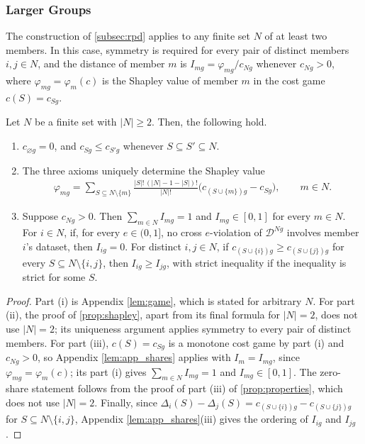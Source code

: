\documentclass[11 pt]{article}
\begin{document}
\subsubsection{Larger Groups}\label{subsec:app_largerN}

The construction of \autoref{subsec:rpd} applies to any finite set $N$ of at least two members. In this case, symmetry is required for every pair of distinct members $i, j \in N$, and the distance of member $m$ is $I_{mg} = \varphi_{mg}/c_{Ng}$ whenever $c_{Ng} > 0$, where $\varphi_{mg} = \varphi_{m}(c)$ is the Shapley value of member $m$ in the cost game $c(S) = c_{Sg}$.

\begin{proposition}\label{prop:app_largerN}
Let $N$ be a finite set with $|N| \geq 2$. Then, the following hold.
\begin{enumerate}
\item[(i)] $c_{\varnothing g} = 0$, and $c_{Sg} \leq c_{S'g}$ whenever $S \subseteq S' \subseteq N$.
\item[(ii)] The three axioms uniquely determine the Shapley value
\begin{align*}
\varphi_{mg} = \sum_{S \subseteq N \setminus \{m\}} \frac{|S|!\,(|N|-1-|S|)!}{|N|!} \bigl( c_{(S \cup \{m\})g} - c_{Sg} \bigr), \qquad m \in N.
\end{align*}
\item[(iii)] Suppose $c_{Ng} > 0$. Then $\sum_{m \in N} I_{mg} = 1$ and $I_{mg} \in [0,1]$ for every $m \in N$. For $i \in N$, if, for every $e \in (0,1]$, no cross $e$-violation of $\mathcal{D}^{Ng}$ involves member $i$'s dataset, then $I_{ig} = 0$. For distinct $i, j \in N$, if $c_{(S \cup \{i\})g} \geq c_{(S \cup \{j\})g}$ for every $S \subseteq N \setminus \{i,j\}$, then $I_{ig} \geq I_{jg}$, with strict inequality if the inequality is strict for some $S$.
\end{enumerate}
\end{proposition}

\begin{proof}
Part (i) is Appendix \autoref{lem:game}, which is stated for arbitrary $N$. For part (ii), the proof of \autoref{prop:shapley}, apart from its final formula for $|N| = 2$, does not use $|N| = 2$; its uniqueness argument applies symmetry to every pair of distinct members. For part (iii), $c(S) = c_{Sg}$ is a monotone cost game by part (i) and $c_{Ng} > 0$, so Appendix \autoref{lem:app_shares} applies with $I_{m} = I_{mg}$, since $\varphi_{mg} = \varphi_{m}(c)$; its part (i) gives $\sum_{m \in N} I_{mg} = 1$ and $I_{mg} \in [0,1]$. The zero-share statement follows from the proof of part (iii) of \autoref{prop:properties}, which does not use $|N| = 2$. Finally, since $\Delta_{i}(S) - \Delta_{j}(S) = c_{(S \cup \{i\})g} - c_{(S \cup \{j\})g}$ for $S \subseteq N \setminus \{i,j\}$, Appendix \autoref{lem:app_shares}(iii) gives the ordering of $I_{ig}$ and $I_{jg}$.
\end{proof}
\end{document}
